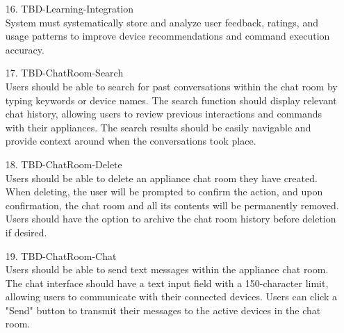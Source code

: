 \documentclass[conference]{IEEEtran}
\begin{document}
\begin{enumerate}
\begin{itemize}
\begin{itemize}
    \begin{enumerate}
        \item[16.] TBD-Learning-Integration \\
                 System must systematically store and analyze user feedback, ratings, and usage patterns to improve device recommendations and command execution accuracy. \\
    \end{enumerate}

    \begin{enumerate}
        \item[17.] TBD-ChatRoom-Search\\
            Users should be able to search for past conversations within the chat room by typing keywords or device names. The search function should display relevant chat history, allowing users to review previous interactions and commands with their appliances. The search results should be easily navigable and provide context around when the conversations took place. \\
    \end{enumerate}

    \begin{enumerate}
        \item[18.] TBD-ChatRoom-Delete\\
            Users should be able to delete an appliance chat room they have created. When deleting, the user will be prompted to confirm the action, and upon confirmation, the chat room and all its contents will be permanently removed. Users should have the option to archive the chat room history before deletion if desired. \\
    \end{enumerate}

    \begin{enumerate}
        \item[19.] TBD-ChatRoom-Chat\\
            Users should be able to send text messages within the appliance chat room. The chat interface should have a text input field with a 150-character limit, allowing users to communicate with their connected devices. Users can click a "Send" button to transmit their messages to the active devices in the chat room. \\
    \end{enumerate}
    


\end{itemize}
\end{itemize}
\end{enumerate}
\end{document}
